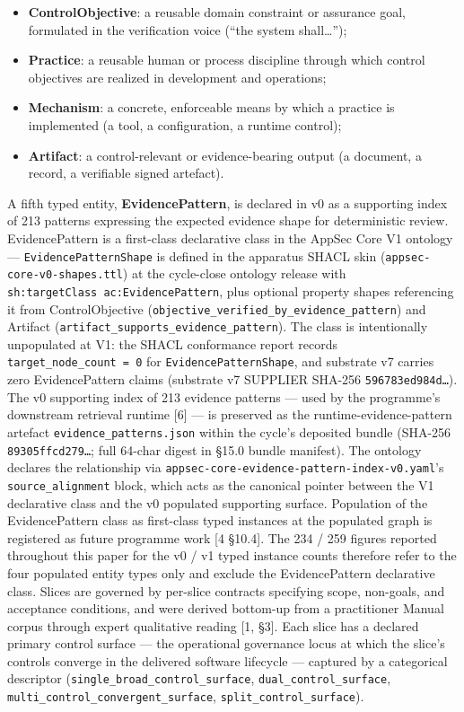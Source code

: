 \documentclass[
]{article}
\providecommand{\tightlist}{%
  \setlength{\itemsep}{0pt}\setlength{\parskip}{0pt}}
\begin{document}
\begin{itemize}
\tightlist
\item
  \textbf{ControlObjective}: a reusable domain constraint or assurance
  goal, formulated in the verification voice (``the system
  shall\ldots{}'');
\item
  \textbf{Practice}: a reusable human or process discipline through
  which control objectives are realized in development and operations;
\item
  \textbf{Mechanism}: a concrete, enforceable means by which a practice
  is implemented (a tool, a configuration, a runtime control);
\item
  \textbf{Artifact}: a control-relevant or evidence-bearing output (a
  document, a record, a verifiable signed artefact).
\end{itemize}

A fifth typed entity, \textbf{EvidencePattern}, is declared in v0 as a
supporting index of 213 patterns expressing the expected evidence shape
for deterministic review. EvidencePattern is a first-class declarative
class in the AppSec Core V1 ontology --- \texttt{EvidencePatternShape}
is defined in the apparatus SHACL skin
(\texttt{appsec-core-v0-shapes.ttl}) at the cycle-close ontology release
with \texttt{sh:targetClass\ ac:EvidencePattern}, plus optional property
shapes referencing it from ControlObjective
(\texttt{objective\_verified\_by\_evidence\_pattern}) and Artifact
(\texttt{artifact\_supports\_evidence\_pattern}). The class is
intentionally unpopulated at V1: the SHACL conformance report records
\texttt{target\_node\_count\ =\ 0} for \texttt{EvidencePatternShape},
and substrate v7 carries zero EvidencePattern claims (substrate v7
SUPPLIER SHA-256 \texttt{596783ed984d…}). The v0 supporting index of 213
evidence patterns --- used by the programme's downstream retrieval
runtime {[}6{]} --- is preserved as the runtime-evidence-pattern
artefact \texttt{evidence\_patterns.json} within the cycle's deposited
bundle (SHA-256 \texttt{89305ffcd279…}; full 64-char digest in §15.0
bundle manifest). The ontology declares the relationship via
\texttt{appsec-core-evidence-pattern-index-v0.yaml}'s
\texttt{source\_alignment} block, which acts as the canonical pointer
between the V1 declarative class and the v0 populated supporting
surface. Population of the EvidencePattern class as first-class typed
instances at the populated graph is registered as future programme work
{[}4 §10.4{]}. The 234 / 259 figures reported throughout this paper for
the v0 / v1 typed instance counts therefore refer to the four populated
entity types only and exclude the EvidencePattern declarative class.
Slices are governed by per-slice contracts specifying scope, non-goals,
and acceptance conditions, and were derived bottom-up from a
practitioner Manual corpus through expert qualitative reading {[}1,
§3{]}. Each slice has a declared primary control surface --- the
operational governance locus at which the slice's controls converge in
the delivered software lifecycle --- captured by a categorical
descriptor (\texttt{single\_broad\_control\_surface},
\texttt{dual\_control\_surface},
\texttt{multi\_control\_convergent\_surface},
\texttt{split\_control\_surface}).
\end{document}

